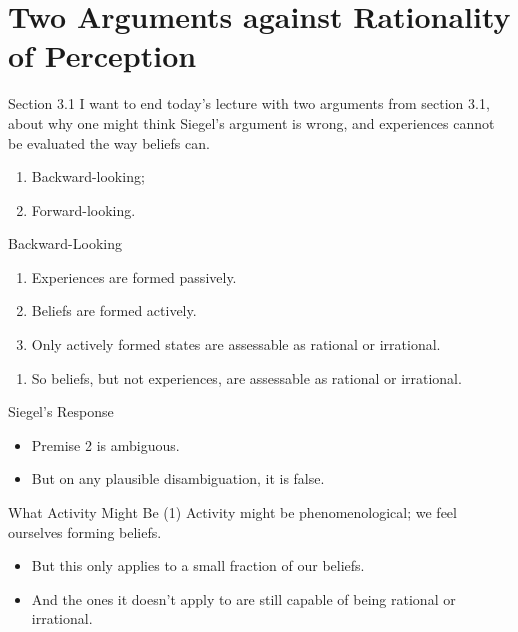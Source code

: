 \documentclass[
  17pt,
  letterpaper,
  ignorenonframetext,
  aspectratio=169,
  handout,
  xcolor={dvipsnames}]{beamer}
\providecommand{\tightlist}{%
  \setlength{\itemsep}{0pt}\setlength{\parskip}{0pt}}\usepackage{longtable,booktabs,array}
\begin{document}
\hypertarget{two-arguments-against-rationality-of-perception}{%
\section{Two Arguments against Rationality of
Perception}\label{two-arguments-against-rationality-of-perception}}

\begin{frame}{Section 3.1}
\protect\hypertarget{section-3.1}{}
I want to end today's lecture with two arguments from section 3.1, about
why one might think Siegel's argument is wrong, and experiences cannot
be evaluated the way beliefs can.

\begin{enumerate}[<+->]
\tightlist
\item
  Backward-looking;
\item
  Forward-looking.
\end{enumerate}
\end{frame}

\begin{frame}{Backward-Looking}
\protect\hypertarget{backward-looking}{}
\begin{enumerate}[<+->]
\tightlist
\item
  Experiences are formed passively.
\item
  Beliefs are formed actively.
\item
  Only actively formed states are assessable as rational or irrational.
\end{enumerate}

\begin{enumerate}[<+->]
[A.]
\setcounter{enumi}{2}
\tightlist
\item
  So beliefs, but not experiences, are assessable as rational or
  irrational.
\end{enumerate}
\end{frame}

\begin{frame}{Siegel's Response}
\protect\hypertarget{siegels-response}{}
\begin{itemize}[<+->]
\tightlist
\item
  Premise 2 is ambiguous.
\item
  But on any plausible disambiguation, it is false.
\end{itemize}
\end{frame}

\begin{frame}{What Activity Might Be (1)}
\protect\hypertarget{what-activity-might-be-1}{}
Activity might be phenomenological; we feel ourselves forming beliefs.

\begin{itemize}[<+->]
\tightlist
\item
  But this only applies to a small fraction of our beliefs.
\item
  And the ones it doesn't apply to are still capable of being rational
  or irrational.
\end{itemize}
\end{frame}
\end{document}
